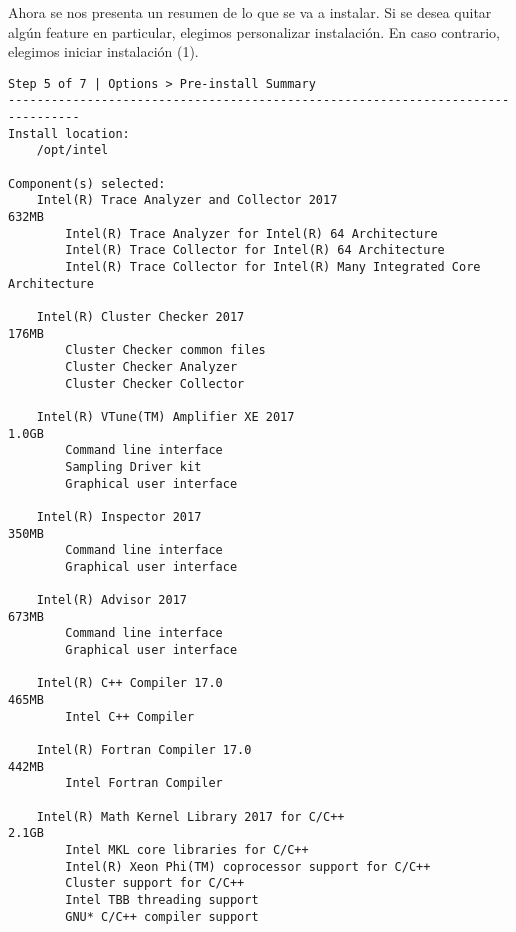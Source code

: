 Ahora se nos presenta un resumen de lo que se va a instalar. Si se desea quitar algún feature en particular, elegimos personalizar instalación. En caso contrario, elegimos iniciar instalación (1).

\begin{lstlisting}
Step 5 of 7 | Options > Pre-install Summary
--------------------------------------------------------------------------------
Install location:
    /opt/intel

Component(s) selected:
    Intel(R) Trace Analyzer and Collector 2017                             632MB
        Intel(R) Trace Analyzer for Intel(R) 64 Architecture                    
        Intel(R) Trace Collector for Intel(R) 64 Architecture                   
        Intel(R) Trace Collector for Intel(R) Many Integrated Core Architecture 

    Intel(R) Cluster Checker 2017                                          176MB
        Cluster Checker common files                                            
        Cluster Checker Analyzer                                                
        Cluster Checker Collector                                               

    Intel(R) VTune(TM) Amplifier XE 2017                                   1.0GB
        Command line interface                                                  
        Sampling Driver kit                                                     
        Graphical user interface                                                

    Intel(R) Inspector 2017                                                350MB
        Command line interface                                                  
        Graphical user interface                                                

    Intel(R) Advisor 2017                                                  673MB
        Command line interface                                                  
        Graphical user interface                                                

    Intel(R) C++ Compiler 17.0                                             465MB
        Intel C++ Compiler                                                      

    Intel(R) Fortran Compiler 17.0                                         442MB
        Intel Fortran Compiler                                                  

    Intel(R) Math Kernel Library 2017 for C/C++                            2.1GB
        Intel MKL core libraries for C/C++                                      
        Intel(R) Xeon Phi(TM) coprocessor support for C/C++                     
        Cluster support for C/C++                                               
        Intel TBB threading support                                             
        GNU* C/C++ compiler support                                             


\end{lstlisting}

